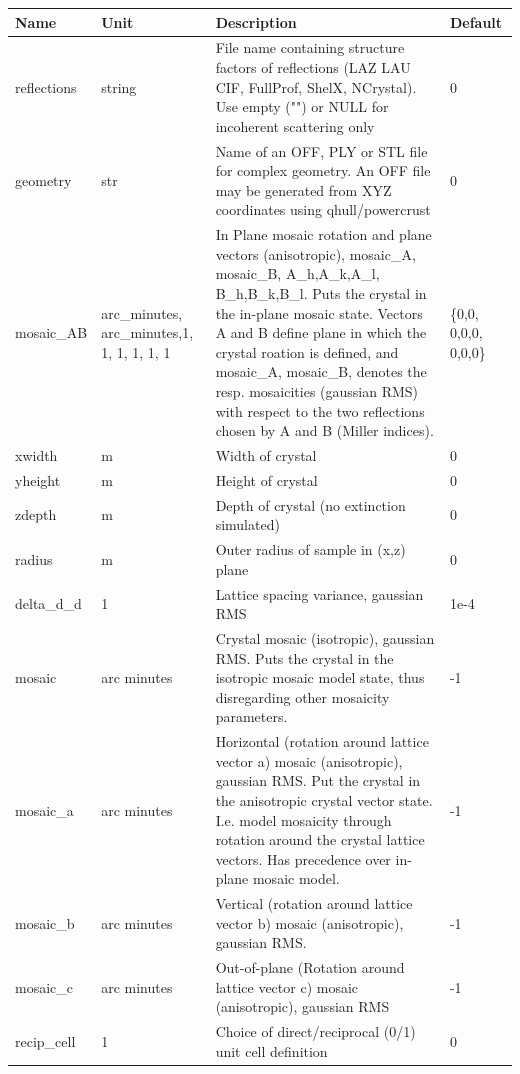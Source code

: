 \begin{longtable}{p{}p{}p{}p{}}
\toprule
\textbf{Name} & \textbf{Unit} & \textbf{Description} & \textbf{Default} \\
\midrule
\endhead
reflections & string & File name containing structure factors of reflections (LAZ LAU CIF, FullProf, ShelX, NCrystal). Use empty ("") or NULL for incoherent scattering only & 0 \\
geometry & str & Name of an OFF, PLY or STL file for complex geometry. An OFF file may be generated from XYZ coordinates using qhull/powercrust & 0 \\
mosaic\_AB & arc\_minutes, arc\_minutes,1, 1, 1, 1, 1, 1 & In Plane mosaic rotation and plane vectors (anisotropic), mosaic\_A, mosaic\_B, A\_h,A\_k,A\_l, B\_h,B\_k,B\_l. Puts the crystal in the in-plane mosaic state. Vectors A and B define plane in which  the crystal roation is defined, and mosaic\_A, mosaic\_B, denotes the resp. mosaicities (gaussian RMS) with respect to the two reflections chosen by A and B (Miller indices). & \{0,0, 0,0,0, 0,0,0\} \\
xwidth & m & Width of crystal & 0 \\
yheight & m & Height of crystal & 0 \\
zdepth & m & Depth of crystal (no extinction simulated) & 0 \\
radius & m & Outer radius of sample in (x,z) plane & 0 \\
delta\_d\_d & 1 & Lattice spacing variance, gaussian RMS & 1e-4 \\
mosaic & arc minutes & Crystal mosaic (isotropic), gaussian RMS. Puts the crystal in the isotropic mosaic model state, thus disregarding other mosaicity parameters. & -1 \\
mosaic\_a & arc minutes & Horizontal (rotation around lattice vector a) mosaic (anisotropic), gaussian RMS. Put the crystal in the anisotropic crystal vector state. I.e. model mosaicity through rotation around the crystal lattice vectors. Has precedence over in-plane mosaic model. & -1 \\
mosaic\_b & arc minutes & Vertical (rotation around lattice vector b) mosaic (anisotropic), gaussian RMS. & -1 \\
mosaic\_c & arc minutes & Out-of-plane (Rotation around lattice vector c) mosaic (anisotropic), gaussian RMS & -1 \\
recip\_cell & 1 & Choice of direct/reciprocal (0/1) unit cell definition & 0 \\

\end{longtable}

